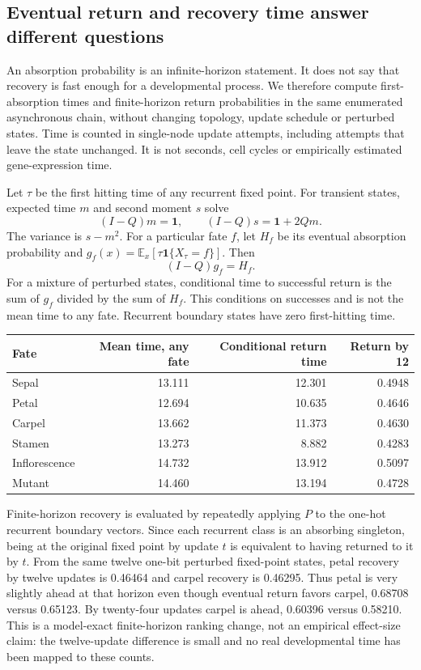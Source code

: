 \subsection{Eventual return and recovery time answer different questions}

An absorption probability is an infinite-horizon statement. It does not say that recovery is fast enough for a developmental process. We therefore compute first-absorption times and finite-horizon return probabilities in the same enumerated asynchronous chain, without changing topology, update schedule or perturbed states. Time is counted in single-node update attempts, including attempts that leave the state unchanged. It is not seconds, cell cycles or empirically estimated gene-expression time.

Let $\tau$ be the first hitting time of any recurrent fixed point. For transient states, expected time $m$ and second moment $s$ solve
\[
(I-Q)m=\mathbf{1},\qquad (I-Q)s=\mathbf{1}+2Qm.
\]
The variance is $s-m^2$. For a particular fate $f$, let $H_f$ be its eventual absorption probability and $g_f(x)=\mathbb{E}_x[\tau\mathbf{1}\{X_\tau=f\}]$. Then
\[
(I-Q)g_f=H_f.
\]
For a mixture of perturbed states, conditional time to successful return is the sum of $g_f$ divided by the sum of $H_f$. This conditions on successes and is not the mean time to any fate. Recurrent boundary states have zero first-hitting time.

\begin{center}\begin{tabular}{lrrr}\hline
Fate & Mean time, any fate & Conditional return time & Return by 12\\\hline
Sepal & 13.111 & 12.301 & 0.4948\\
Petal & 12.694 & 10.635 & 0.4646\\
Carpel & 13.662 & 11.373 & 0.4630\\
Stamen & 13.273 & 8.882 & 0.4283\\
Inflorescence & 14.732 & 13.912 & 0.5097\\
Mutant & 14.460 & 13.194 & 0.4728\\\hline
\end{tabular}\end{center}

Finite-horizon recovery is evaluated by repeatedly applying $P$ to the one-hot recurrent boundary vectors. Since each recurrent class is an absorbing singleton, being at the original fixed point by update $t$ is equivalent to having returned to it by $t$. From the same twelve one-bit perturbed fixed-point states, petal recovery by twelve updates is 0.46464 and carpel recovery is 0.46295. Thus petal is very slightly ahead at that horizon even though eventual return favors carpel, 0.68708 versus 0.65123. By twenty-four updates carpel is ahead, 0.60396 versus 0.58210. This is a model-exact finite-horizon ranking change, not an empirical effect-size claim: the twelve-update difference is small and no real developmental time has been mapped to these counts.

